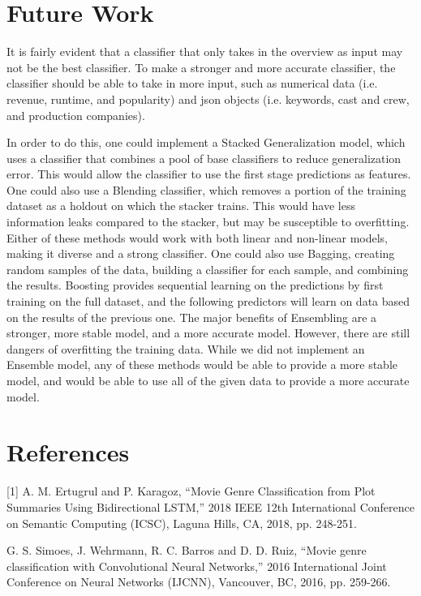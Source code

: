 \documentclass[sigconf]{acmart}
\begin{document}
\section{Future Work}
It is fairly evident that a classifier that only takes in the overview as input may not be the best classifier. To make a stronger and more accurate classifier, the classifier should be able to take in more input, such as numerical data (i.e. revenue, runtime, and popularity) and json objects (i.e. keywords, cast and crew, and production companies). 

In order to do this, one could implement a Stacked Generalization model, which uses a classifier that combines a pool of base classifiers to reduce generalization error. This would allow the classifier to use the first stage predictions as features. One could also use a Blending classifier, which removes a portion of the training dataset as a holdout on which the stacker trains. This would have less information leaks compared to the stacker, but may be susceptible to overfitting. Either of these methods would work with both linear and non-linear models, making it diverse and a strong classifier. One could also use Bagging, creating random samples of the data, building a classifier for each sample, and combining the results. Boosting provides sequential learning on the predictions by first training on the full dataset, and the following predictors will learn on data based on the results of the previous one. The major benefits of Ensembling are a stronger, more stable model, and a more accurate model. However, there are still dangers of overfitting the training data. While we did not implement an Ensemble model, any of these methods would be able to provide a more stable model, and would be able to use all of the given data to provide a more accurate model.

\section{References}

[1] A. M. Ertugrul and P. Karagoz, ``Movie Genre Classification from Plot Summaries Using Bidirectional LSTM,'' 2018 IEEE 12th International Conference on Semantic Computing (ICSC), Laguna Hills, CA, 2018, pp. 248-251.

\noindent[2] G. S. Simoes, J. Wehrmann, R. C. Barros and D. D. Ruiz, ``Movie genre classification with Convolutional Neural Networks,'' 2016 International Joint Conference on Neural Networks (IJCNN), Vancouver, BC, 2016, pp. 259-266.
\end{document}
